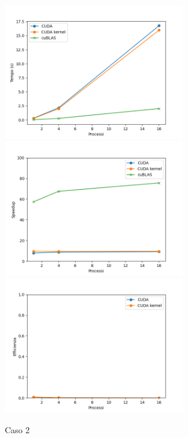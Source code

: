 \begin{figure}[h]
    \centering
    \includegraphics[width=0.7\textwidth]{./imgs/graphs/caso_b.png}
    \includegraphics[width=0.7\textwidth]{./imgs/graphs/caso_b_speedup.png}
    \includegraphics[width=0.7\textwidth]{./imgs/graphs/caso_b_efficiency.png}
    \caption{Caso 2}
\end{figure}


